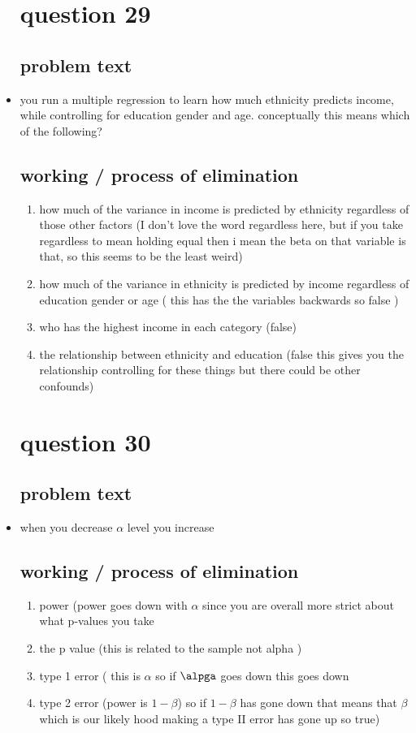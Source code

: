 \documentclass{article}
\begin{document}
\begin{itemize}
\section{question 29}
\subsection{problem text}
\item you run a multiple regression to learn how much ethnicity predicts income, while controlling for education gender and age. conceptually this means which of the following?
\subsection{working / process of elimination }
\begin{enumerate}
    \item how much of the variance in income is predicted by ethnicity regardless of those other factors (I don't love the word regardless here, but if you take regardless to mean holding equal then i mean the beta on that variable is that, so this seems to be the least weird)
    \item how much of the variance in ethnicity is predicted by income regardless of education gender or age ( this has the the variables backwards so false )
    \item who has the highest income in each category (false) 
    \item the relationship between ethnicity and education (false this gives you the relationship controlling for these things but there could be other confounds) 
\end{enumerate}
\section{question 30}
\subsection{problem text}
\item when you decrease $\alpha$ level you increase 
\subsection{working / process of elimination }
\begin{enumerate}
    \item power (power goes down with $\alpha$ since you are overall more strict about what p-values you take
    \item the p value (this is related to the sample not alpha )
    \item type 1 error ( this is $\alpha$ so if $\alpga $ goes down this goes down 
    \item type 2 error (power is $1-\beta$) so if $1-\beta$ has gone down that means that $\beta$ which is our likely hood making a type II error has gone up so true) 
\end{enumerate}


\end{itemize}
\end{document}
